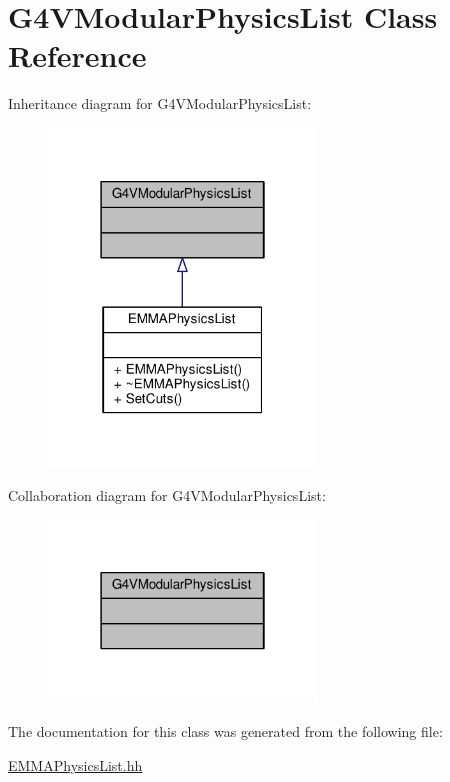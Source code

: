\hypertarget{classG4VModularPhysicsList}{}\section{G4\+V\+Modular\+Physics\+List Class Reference}
\label{classG4VModularPhysicsList}


Inheritance diagram for G4\+V\+Modular\+Physics\+List\+:
\nopagebreak
\begin{figure}[H]
\begin{center}
\leavevmode
\includegraphics[width=202pt]{classG4VModularPhysicsList__inherit__graph}
\end{center}
\end{figure}


Collaboration diagram for G4\+V\+Modular\+Physics\+List\+:
\nopagebreak
\begin{figure}[H]
\begin{center}
\leavevmode
\includegraphics[width=202pt]{classG4VModularPhysicsList__coll__graph}
\end{center}
\end{figure}


The documentation for this class was generated from the following file\+:\begin{DoxyCompactItemize}
\item 
\hyperlink{EMMAPhysicsList_8hh}{E\+M\+M\+A\+Physics\+List.\+hh}\end{DoxyCompactItemize}
